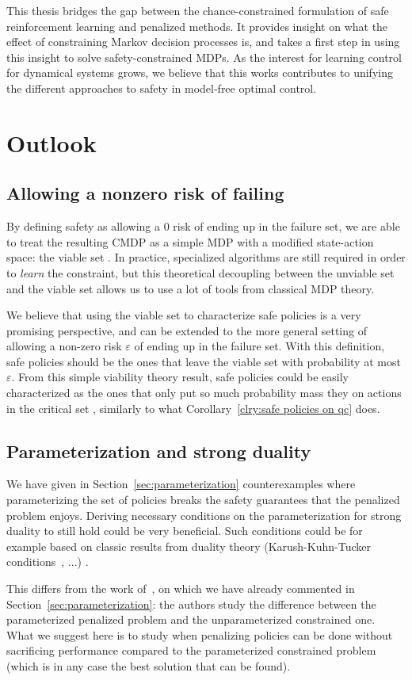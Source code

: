 This thesis bridges the gap between the chance-constrained formulation of safe reinforcement learning and penalized methods. It provides insight on what the effect of constraining Markov decision processes is, and takes a first step in using this insight to solve safety-constrained MDPs. As the interest for learning control for dynamical systems grows, we believe that this works contributes to unifying the different approaches to safety in model-free optimal control.

\section{Outlook}

\subsection{Allowing a nonzero risk of failing} \label{sec:future nonzero}
By defining safety as allowing a $0$ risk of ending up in the failure set, we are able to treat the resulting CMDP as a simple MDP with a modified state-action space: the viable set \QV. In practice, specialized algorithms are still required in order to\emph{ learn} the constraint, but this theoretical decoupling between the unviable set and the viable set allows us to use a lot of tools from classical MDP theory.\par
We believe that using the viable set to characterize safe policies is a very promising perspective, and can be extended to the more general setting of allowing a non-zero risk $\varepsilon$ of ending up in the failure set. With this definition, safe policies should be the ones that leave the viable set with probability at most $\varepsilon$. From this simple viability theory result, safe policies could be easily characterized as the ones that only put so much probability mass they on actions in the critical set \QC, similarly to what Corollary~\ref{clry:safe policies on qc} does.
\subsection{Parameterization and strong duality}
We have given in Section~\ref{sec:parameterization} counterexamples where parameterizing the set of policies breaks the safety guarantees that the penalized problem enjoys. Deriving necessary conditions on the parameterization for strong duality to still hold could be very beneficial. Such conditions could be for example based on classic results from duality theory (Karush-Kuhn-Tucker conditions~\cite{boyd2004convex}, ...) .\par
This differs from the work of~\textcite{paternain2019safe}, on which we have already commented in Section~\ref{sec:parameterization}: the authors study the difference between the parameterized penalized problem and the unparameterized constrained one. What we suggest here is to study when penalizing policies can be done without sacrificing performance compared to the parameterized constrained problem (which is in any case the best solution that can be found).


